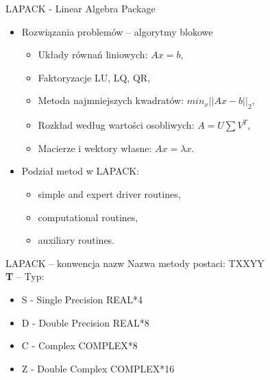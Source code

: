 	\begin{frame}{LAPACK - Linear Algebra Package}
		\begin{itemize}
			\item Rozwiązania problemów -- algorytmy blokowe
			\begin{itemize}
				\item Układy równań liniowych: $Ax = b$,
				\item Faktoryzacje LU, LQ, QR,
				\item Metoda najmniejszych kwadratów: $min_x ||Ax - b ||_2$,
				\item Rozkład według wartości osobliwych: $A = U\sum V^T$,
				\item Macierze i wektory własne: $Ax = \lambda x$.
			\end{itemize}

			\item Podział metod w LAPACK:
			\begin{itemize}
				\item simple and expert driver routines,
				\item computational routines,
				\item auxiliary routines.
			\end{itemize}
		\end{itemize}
	\end{frame}

	\begin{frame}{LAPACK -- konwencja nazw}
	Nazwa metody postaci: TXXYY \\
	\vspace{5mm}
	\textbf{T} -- Typ: \\
	\begin{itemize}
		\item S - Single Precision REAL*4 \\
		\item D - Double Precision REAL*8 \\
		\item C - Complex COMPLEX*8 \\
		\item Z - Double Complex COMPLEX*16
	\end{itemize}
	\end{frame}

